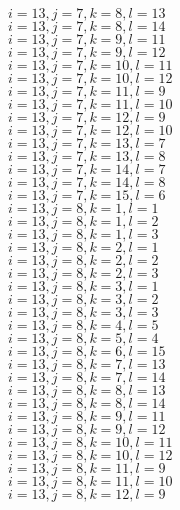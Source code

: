 \documentclass[14pt]{article}
\begin{document}
    $i=13,j=7,k=8,l=13 $ \\ 
    $i=13,j=7,k=8,l=14 $ \\ 
    $i=13,j=7,k=9,l=11 $ \\ 
    $i=13,j=7,k=9,l=12 $ \\ 
    $i=13,j=7,k=10,l=11 $ \\ 
    $i=13,j=7,k=10,l=12 $ \\ 
    $i=13,j=7,k=11,l=9 $ \\ 
    $i=13,j=7,k=11,l=10 $ \\ 
    $i=13,j=7,k=12,l=9 $ \\ 
    $i=13,j=7,k=12,l=10 $ \\ 
    $i=13,j=7,k=13,l=7 $ \\ 
    $i=13,j=7,k=13,l=8 $ \\ 
    $i=13,j=7,k=14,l=7 $ \\ 
    $i=13,j=7,k=14,l=8 $ \\ 
    $i=13,j=7,k=15,l=6 $ \\ 
    $i=13,j=8,k=1,l=1 $ \\ 
    $i=13,j=8,k=1,l=2 $ \\ 
    $i=13,j=8,k=1,l=3 $ \\ 
    $i=13,j=8,k=2,l=1 $ \\ 
    $i=13,j=8,k=2,l=2 $ \\ 
    $i=13,j=8,k=2,l=3 $ \\ 
    $i=13,j=8,k=3,l=1 $ \\ 
    $i=13,j=8,k=3,l=2 $ \\ 
    $i=13,j=8,k=3,l=3 $ \\ 
    $i=13,j=8,k=4,l=5 $ \\ 
    $i=13,j=8,k=5,l=4 $ \\ 
    $i=13,j=8,k=6,l=15 $ \\ 
    $i=13,j=8,k=7,l=13 $ \\ 
    $i=13,j=8,k=7,l=14 $ \\ 
    $i=13,j=8,k=8,l=13 $ \\ 
    $i=13,j=8,k=8,l=14 $ \\ 
    $i=13,j=8,k=9,l=11 $ \\ 
    $i=13,j=8,k=9,l=12 $ \\ 
    $i=13,j=8,k=10,l=11 $ \\ 
    $i=13,j=8,k=10,l=12 $ \\ 
    $i=13,j=8,k=11,l=9 $ \\ 
    $i=13,j=8,k=11,l=10 $ \\ 
    $i=13,j=8,k=12,l=9 $ \\ 
\end{document}

